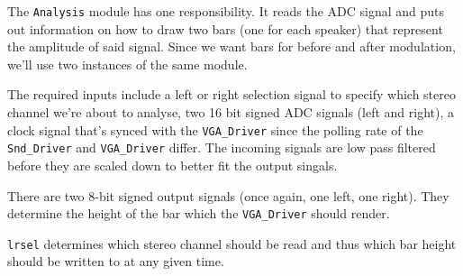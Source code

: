 The \verb=Analysis= module has one responsibility. It reads the ADC signal and puts out information on how to draw two bars (one for each speaker) that represent the amplitude of said signal. Since we want bars for before and after modulation, we'll use two instances of the same module. 

The required inputs include a left or right selection signal to specify which stereo channel we're about to analyse, two 16 bit signed ADC signals (left and right), a clock signal that's synced with the \verb=VGA_Driver= since the polling rate of the \verb=Snd_Driver= and \verb=VGA_Driver= differ. The incoming signals are low pass filtered before they are scaled down to better fit the output singals.

There are two 8-bit signed output signals (once again, one left, one right). They determine the height of the bar which the \verb=VGA_Driver= should render.

\verb=lrsel= determines which stereo channel should be read and thus which bar height should be written to at any given time.
